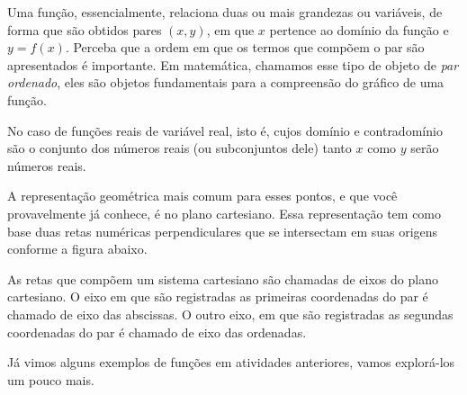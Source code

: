 Uma função, essencialmente, relaciona duas ou mais grandezas ou variáveis, de forma que são obtidos pares \((x,y)\), em que \(x\) pertence ao domínio da função e \(y=f(x)\). Perceba que a ordem em que os termos que compõem o par são apresentados é importante. Em matemática, chamamos esse tipo de objeto de \emph{par ordenado}, eles são objetos fundamentais para a compreensão do gráfico de uma função.

No caso de funções reais de variável real, isto é, cujos domínio e contradomínio são o conjunto dos números reais (ou subconjuntos dele) tanto \(x\) como \(y\) serão números reais.

A representação geométrica mais comum para esses pontos, e que você provavelmente já conhece, é no plano cartesiano. Essa representação tem como base duas retas numéricas perpendiculares que se intersectam em suas origens conforme a figura abaixo.

\clearpage
\begin{center}\end{center}

As retas que compõem um sistema cartesiano são chamadas de eixos do plano cartesiano. O eixo em que são registradas as primeiras coordenadas do par é chamado de eixo das abscissas. O outro eixo, em que são registradas as segundas coordenadas do par é chamado de eixo das ordenadas.

Já vimos alguns exemplos de funções em atividades anteriores, vamos explorá-los um pouco mais.


